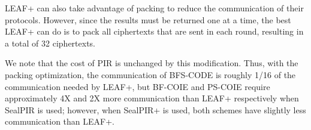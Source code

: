 LEAF+ can also take advantage of packing to reduce the communication of
their protocols.  However, since the results must be returned one at a
time, the best LEAF+ can do is to pack all ciphertexts that are sent in
each round, resulting in a total of 32 ciphertexts. 

We note that the cost of PIR is unchanged by this modification.  Thus,
with the packing optimization, the communication of BFS-CODE is roughly
1/16 of the communication needed by LEAF+, but BF-COIE and PS-COIE
require approximately 4X and 2X more communication than LEAF+
respectively when SealPIR is used; however, when SealPIR+ is used, both
schemes have slightly less communication than LEAF+.  

